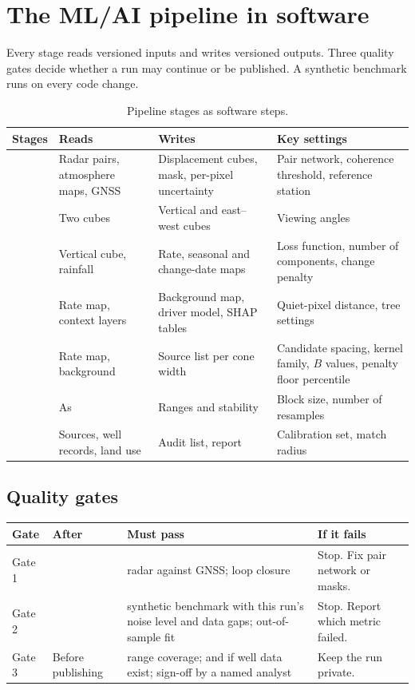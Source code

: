 \section{The ML/AI pipeline in software}\label{sec:mlops}

\begin{inshort}
Every stage reads versioned inputs and writes versioned outputs. Three quality gates decide whether a
run may continue or be published. A synthetic benchmark runs on every code change.
\end{inshort}

{\small
\begin{xltabular}{\linewidth}{@{}L{17mm}L{35mm}L{37mm}Y@{}}
\caption{Pipeline stages as software steps.}\label{tab:dag}\\*
\toprule
\textbf{Stages} & \textbf{Reads} & \textbf{Writes} & \textbf{Key settings}\\*
\midrule
{}  & Radar pairs, atmosphere maps, GNSS & Displacement cubes, mask, per-pixel uncertainty &
  Pair network, coherence threshold, reference station\\
 & Two cubes & Vertical and east--west cubes & Viewing angles\\
 & Vertical cube, rainfall & Rate, seasonal and change-date maps & Loss function, number of
  components, change penalty\\
 & Rate map, context layers & Background map, driver model, SHAP tables & Quiet-pixel distance, tree
  settings\\
 & Rate map, background & Source list per cone width & Candidate spacing, kernel family, $B$ values,
  penalty floor percentile\\
 & As  & Ranges and stability & Block size, number of resamples\\
  & Sources, well records, land use & Audit list, report & Calibration set, match radius\\
\bottomrule
\end{xltabular}}

\subsection{Quality gates}

{\small
\begin{xltabular}{\linewidth}{@{}L{17mm}L{28mm}Y Y@{}}
\toprule
\textbf{Gate} & \textbf{After} & \textbf{Must pass} & \textbf{If it fails}\\*
\midrule
Gate 1 &  &  radar against GNSS;  loop closure & Stop. Fix pair network or masks.\\
Gate 2 &  &  synthetic benchmark with this run's noise level and data gaps;  out-of-sample
  fit & Stop. Report which metric failed.\\
Gate 3 & Before publishing &  range coverage;  and  if well data exist; sign-off by a named
  analyst & Keep the run private.\\
\bottomrule
\end{xltabular}}

